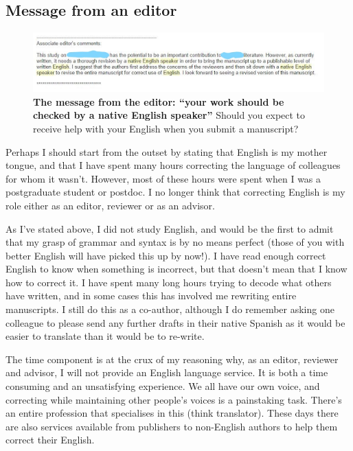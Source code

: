 \documentclass[
]{krantz}
\begin{document}
\hypertarget{message-from-an-editor}{%
\subsection{Message from an editor}\label{message-from-an-editor}}



\begin{figure}
\includegraphics[width=0.95\linewidth]{figures/editor} \caption{\textbf{The message from the editor: ``your work should be checked by a native English speaker''} Should you expect to receive help with your English when you submit a manuscript?}\label{fig:editor}
\end{figure}

Perhaps I should start from the outset by stating that English is my mother tongue, and that I have spent many hours correcting the language of colleagues for whom it wasn't. However, most of these hours were spent when I was a postgraduate student or postdoc. I no longer think that correcting English is my role either as an editor, reviewer or as an advisor.

As I've stated above, I did not study English, and would be the first to admit that my grasp of grammar and syntax is by no means perfect (those of you with better English will have picked this up by now!). I have read enough correct English to know when something is incorrect, but that doesn't mean that I know how to correct it. I have spent many long hours trying to decode what others have written, and in some cases this has involved me rewriting entire manuscripts. I still do this as a co-author, although I do remember asking one colleague to please send any further drafts in their native Spanish as it would be easier to translate than it would be to re-write.

The time component is at the crux of my reasoning why, as an editor, reviewer and advisor, I will not provide an English language service. It is both a time consuming and an unsatisfying experience. We all have our own voice, and correcting while maintaining other people's voices is a painstaking task. There's an entire profession that specialises in this (think translator). These days there are also services available from publishers to non-English authors to help them correct their English.
\end{document}
